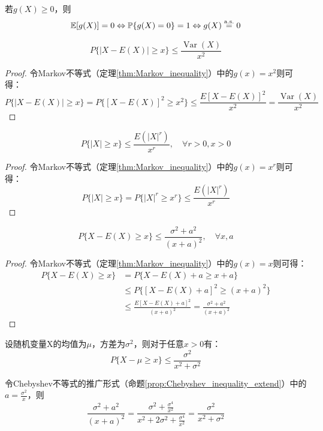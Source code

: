 \begin{corollary}
    若$g(X) \ge 0$，则
    \[ \mathbb{E}[g(X)] = 0 \Leftrightarrow  \mathbb{P}\{g(X)=0\} = 1 \Leftrightarrow g(X) \overset{\mathrm{a.s.}}{=} 0 \]
\end{corollary}

\begin{proposition}[Chebyshev不等式]
    \[ P\{ \left\vert X-E(X) \right\vert \ge x \} \le \frac{\operatorname{Var}(X)}{x^2}\]
\end{proposition}
\begin{proof}
    令Markov不等式（定理\ref{thm:Markov_inequality}）中的$g(x)=x^2$则可得：
    \[ P\{ \left\vert X-E(X) \right\vert \ge x \} = P\{ [X-E(X)]^2 \ge x^2 \} \le \frac{E[X-E(X)]^2}{x^2}=\frac{\operatorname{Var}(X)}{x^2} \]
\end{proof}

\begin{proposition}[Markov不等式]
    \[ P\{ \left\vert X \right\vert \ge x \} \le \frac{E(|X|^r)}{x^r} ,\quad \forall r>0,x>0\]
\end{proposition}
\begin{proof}
    令Markov不等式（定理\ref{thm:Markov_inequality}）中的$g(x)=x^r$则可得：
    \[ P\{ \left\vert X \right\vert \ge x \} = P\{ |X|^r \ge x^r \} \le \frac{E(|X|^r)}{x^r} \]
\end{proof}

\begin{proposition}[Chebyshev不等式的推广]\label{prop:Chebyshev_inequality_extend}
    \[ P\{ X-E(X) \ge x \} \le \frac{\sigma^2+a^2}{(x+a)^2} ,\quad \forall x,a\]
\end{proposition}
\begin{proof}
    令Markov不等式（定理\ref{thm:Markov_inequality}）中的$g(x)=x$则可得：
    \begin{align*}
        P\{ X-E(X) \ge x \} & =P\{ X-E(X)+a \ge x+a \}                                         \\
                            & \le  P\{ [X-E(X)+a]^2 \ge (x+a)^2 \}                             \\
                            & \le \frac{E[X-E(X)+a]^2}{(x+a)^2} = \frac{\sigma^2+a^2}{(x+a)^2}
    \end{align*}
\end{proof}

\begin{example}[单边Chebyshev不等式]
    设随机变量X的均值为$\mu$，方差为$\sigma^2$，则对于任意$x>0$有：
    \[ P\{ X-\mu\ge x \}\le \frac{\sigma^2}{x^2+\sigma^2} \]
\end{example}
\begin{solution}
    令Chebyshev不等式的推广形式（命题\ref{prop:Chebyshev_inequality_extend}）中的$a=\frac{\sigma^2}{x}$，则
    \[ \frac{\sigma^2+a^2}{(x+a)^2}=\frac{\sigma^2+\frac{\sigma^4}{x^2}}{x^2+2\sigma^2+\frac{\sigma^4}{x^2}}=\frac{\sigma^2}{x^2+\sigma^2} \]
\end{solution}

